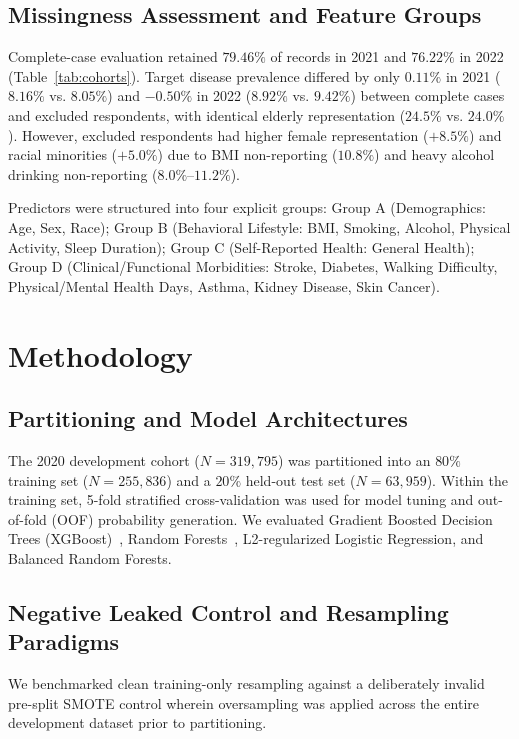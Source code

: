 \documentclass[11pt,a4paper]{article}
\begin{document}
\subsection{Missingness Assessment and Feature Groups}
Complete-case evaluation retained $79.46\%$ of records in 2021 and $76.22\%$ in 2022 (Table~\ref{tab:cohorts}). Target disease prevalence differed by only $0.11\%$ in 2021 ($8.16\%$ vs. $8.05\%$) and $-0.50\%$ in 2022 ($8.92\%$ vs. $9.42\%$) between complete cases and excluded respondents, with identical elderly representation ($24.5\%$ vs. $24.0\%$). However, excluded respondents had higher female representation ($+8.5\%$) and racial minorities ($+5.0\%$) due to BMI non-reporting ($10.8\%$) and heavy alcohol drinking non-reporting ($8.0\%$--$11.2\%$).

Predictors were structured into four explicit groups: Group A (Demographics: Age, Sex, Race); Group B (Behavioral Lifestyle: BMI, Smoking, Alcohol, Physical Activity, Sleep Duration); Group C (Self-Reported Health: General Health); Group D (Clinical/Functional Morbidities: Stroke, Diabetes, Walking Difficulty, Physical/Mental Health Days, Asthma, Kidney Disease, Skin Cancer).

\section{Methodology}

\subsection{Partitioning and Model Architectures}
The 2020 development cohort ($N = 319,795$) was partitioned into an $80\%$ training set ($N = 255,836$) and a $20\%$ held-out test set ($N = 63,959$). Within the training set, 5-fold stratified cross-validation was used for model tuning and out-of-fold (OOF) probability generation. We evaluated Gradient Boosted Decision Trees (XGBoost)~\cite{Chen2016_XGBoost}, Random Forests~\cite{Breiman2001_RF}, L2-regularized Logistic Regression, and Balanced Random Forests.

\subsection{Negative Leaked Control and Resampling Paradigms}
We benchmarked clean training-only resampling against a deliberately invalid pre-split SMOTE control wherein oversampling was applied across the entire development dataset prior to partitioning.
\end{document}
